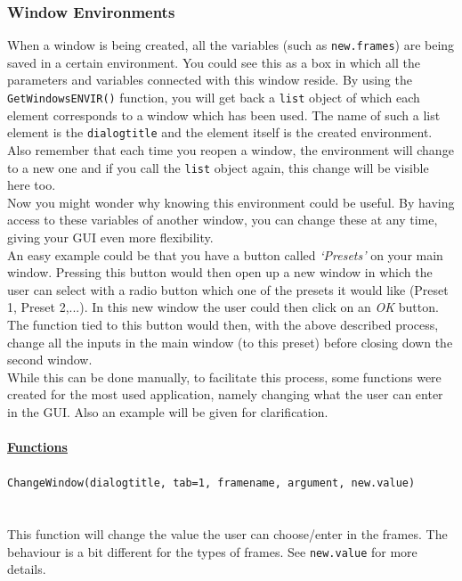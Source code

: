 \documentclass[a4paper]{article}\usepackage[]{graphicx}\usepackage[]{color}
\begin{document}
\subsubsection{Window Environments}
\noindent When a window is being created, all the variables (such as
\verb|new.frames|) are being saved in a certain environment. You could see this
as a box in which all the parameters and variables connected with this window
reside. By using the \verb|GetWindowsENVIR()| function, you will get back a
\verb|list| object of which each element corresponds to a window which has
been used. The name of such a list element is the \verb|dialogtitle| and the
element itself is the created environment. Also remember that each time you
reopen a window, the environment will change to a new one and if you call the
\verb|list| object again, this change will be visible here too.\\
Now you might wonder why knowing this environment could be useful. By having
access to these variables of another window, you can change these at any time,
giving your GUI even more flexibility.\\
An easy example could be that you have a button called {\it `Presets'} on your
main window. Pressing this button would then open up a new window in which the
user can select with a radio button which one of the presets it would like
(Preset 1, Preset 2,...). In this new window the user could then click on an
{\it OK} button. The function tied to this button would then, with the above
described process, change all the inputs in the main window (to this preset) before closing down
the second window.
\\
While this can be done manually, to facilitate this process, some functions were
created for the most used application, namely changing what the user can enter
in the GUI. Also an example will be given for clarification.
\\ \\
{\bf \underline{Functions}}
\\ \\
\noindent \verb|ChangeWindow(dialogtitle, tab=1, framename, argument, new.value)|
\\ \\
\\
\noindent This function will change the value the user can choose/enter in the
frames. The behaviour is a bit different for the types of frames. See
\verb|new.value| for more details.
\end{document}
